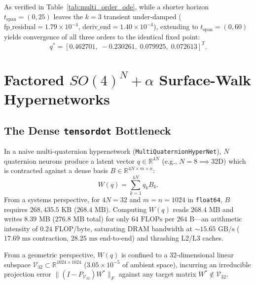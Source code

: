 \documentclass[11pt,twocolumn]{article}
\begin{document}
As verified in Table~\ref{tab:multi_order_ode}, while a shorter horizon $t_{\text{span}} = (0, 25)$ leaves the $k=3$ transient under-damped ($\text{fp\_residual} = 1.79 \times 10^{-4}$, $\text{deriv\_end} = 1.40 \times 10^{-4}$), extending to $t_{\text{span}} = (0, 60)$ yields convergence of all three orders to the identical fixed point:
\begin{equation}
q^* = [0.462701,\; -0.230261,\; 0.079925,\; 0.072613]^T.
\end{equation}

\section{Factored $SO(4)^N + \alpha$ Surface-Walk Hypernetworks}

\subsection{The Dense \texttt{tensordot} Bottleneck}
In a naive multi-quaternion hypernetwork (\texttt{MultiQuaternionHyperNet}), $N$ quaternion neurons produce a latent vector $q \in \mathbb{R}^{4N}$ (e.g., $N=8 \implies 32\text{D}$) which is contracted against a dense basis $B \in \mathbb{R}^{4N \times m \times n}$:
\begin{equation}
W(q) = \sum_{k=1}^{4N} q_k B_k.
\end{equation}
From a systems perspective, for $4N=32$ and $m=n=1024$ in \texttt{float64}, $B$ requires $268{,}435.5\text{ KB}$ ($268.4\text{ MB}$). Computing $W(q)$ reads $268.4\text{ MB}$ and writes $8.39\text{ MB}$ ($276.8\text{ MB}$ total) for only $64\text{ FLOPs}$ per $264\text{ B}$—an arithmetic intensity of $0.24\text{ FLOP/byte}$, saturating DRAM bandwidth at $\sim 15.65\text{ GB/s}$ ($17.69\text{ ms}$ contraction, $28.25\text{ ms}$ end-to-end) and thrashing L2/L3 caches.

From a geometric perspective, $W(q)$ is confined to a $32$-dimensional linear subspace $\mathcal{V}_{32} \subset \mathbb{R}^{1024 \times 1024}$ ($3.05 \times 10^{-5}$ of ambient space), incurring an irreducible projection error $\|(I - P_{\mathcal{V}_{32}})W^*\|_F$ against any target matrix $W^* \notin \mathcal{V}_{32}$.
\end{document}
